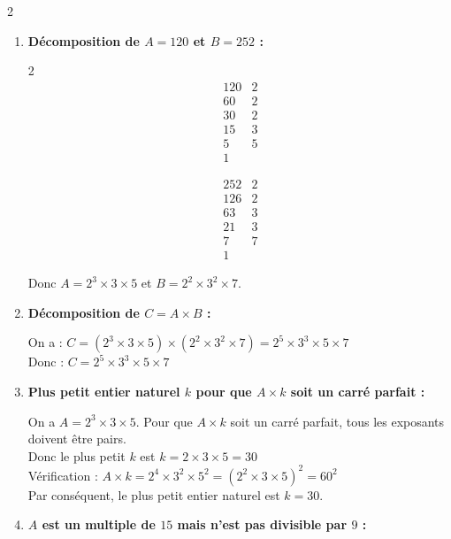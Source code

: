 \documentclass[10pt, a4paper]{article}
\begin{document}
\begin{multicols*}{2}
\begin{Solution}[APPLICATION][9]
\begin{enumerate}[leftmargin=*,itemsep=0.5pt]
    \item \textbf{Décomposition de $A = 120$ et $B = 252$ :}

    \begin{multicols}{2}
    \[
    \begin{array}{r|l}
    120 & 2 \\
    60  & 2 \\
    30  & 2 \\
    15  & 3 \\
    5   & 5 \\
    1   &
    \end{array}
    \]

    \columnbreak

    \[
    \begin{array}{r|l}
    252 & 2 \\
    126 & 2 \\
    63  & 3 \\
    21  & 3 \\
    7   & 7 \\
    1   &
    \end{array}
    \]
    \end{multicols}
    Donc $A = 2^3 \times 3 \times 5$ et $B = 2^2 \times 3^2 \times 7$.

    \item \textbf{Décomposition de $C = A \times B$ :}

    On a :
        $C = (2^3 \times 3 \times 5) \times (2^2 \times 3^2 \times 7)
          = 2^5 \times 3^3 \times 5 \times 7$ \\
    Donc : \quad $C = 2^5 \times 3^3 \times 5 \times 7$

    \item \textbf{Plus petit entier naturel $k$ pour que $A \times k$ soit un carré parfait :}

    On a $A = 2^3 \times 3 \times 5$. Pour que $A \times k$ soit un carré parfait, tous les exposants doivent être pairs. \\
    Donc le plus petit $k$ est $k = 2 \times 3 \times 5 = 30$ \\
    Vérification : $A \times k = 2^4 \times 3^2 \times 5^2 = (2^2 \times 3 \times 5)^2 = 60^2$ \\
    Par conséquent, le plus petit entier naturel est $k = 30$.

    \item \textbf{$A$ est un multiple de $15$ mais n'est pas divisible par $9$ :}


\end{enumerate}
\end{Solution}
\end{multicols*}
\end{document}
